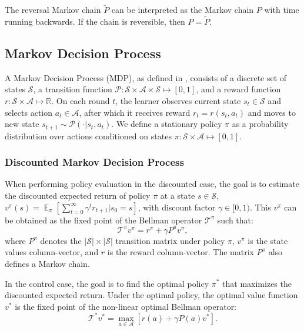 \documentclass{article}
\newcommand{\s}{\mathcal{S}}
\newcommand{\p}{\mathcal{P}}
\newcommand{\pol}{\pi}
\newcommand{\A}{\mathcal{A}}
\newcommand{\R}{\mathbb{R}}
\newcommand{\T}{\mathcal{T}}
\newcommand{\V}{v}
\newcommand{\expect}{\mathop{\mathbb{E}}}
\newcommand{\RE}{r}
\begin{document}
The reversal Markov chain $\widetilde{P}$ can be interpreted as the Markov chain $P$ with time running backwards. If the chain is reversible, then $P=\widetilde{P}$. 


\subsection{Markov Decision Process}
A Markov Decision Process (MDP), as defined in \cite{puterman2014markov}, consists of a discrete set of states $\s$, a transition function $\p : \s \times \A \times \s \mapsto [0,1]$, and a reward function $\RE : \s \times \A \mapsto \R$. On each round $t$, the learner observes current state $s_t\in\s$ and selects action $a_t\in\A$, after which it receives reward $r_t = \RE(s_t,a_t)$ and moves to new state $s_{t+1}\sim \p(\cdot|s_t, a_t)$. We define a stationary policy $\pol$ as a probability distribution over actions conditioned on states $\pol : \s \times \A \mapsto [0,1]$.

\subsubsection{Discounted Markov Decision Process}
When performing policy evaluation in the discounted case, the goal is to estimate the discounted expected return of policy $\pol$ at a state $s\in\s$,  $\V^{\pol}(s) = \expect_{\pol}[\sum_{t=0}^{\infty} \gamma^t \RE_{t+1} | s_0 = s]$, with discount factor $\gamma \in [0,1)$. 
This $\V^{\pol}$ can be obtained as the fixed point of the Bellman operator $\T^{\pol}$ such that:
\begin{equation}
    \T^{\pol} v^{\pol} = r^{\pol} + \gamma P^{\pol}v^{\pol},
\end{equation}
where $P^{\pol}$ denotes the $|\s|\times |\s|$ transition matrix under policy $\pol$, $v^\pi$ is the state values column-vector, and $r$ is the reward column-vector. The matrix $P^{\pol}$ also defines a Markov chain.

In the control case, the goal is to find the optimal policy $\pol^*$ that maximizes the discounted expected return. Under the optimal policy, the optimal value function $\V^*$ is the fixed point of the non-linear optimal Bellman operator:
\begin{equation}
    \T^* v^* = \max_{a \in \A} [r(a) + \gamma P(a)v^*].
\end{equation}
\end{document}
